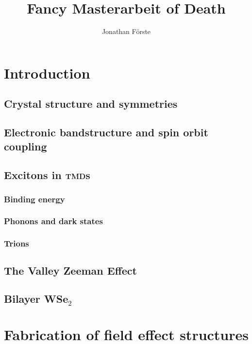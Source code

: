 \documentclass{scrbook}
\title{Fancy Masterarbeit of Death}
\author{Jonathan Förste}
\begin{document}
\maketitle
\tableofcontents
\chapter{Introduction}

	\section{Crystal structure and symmetries}
	\section{Electronic bandstructure and spin orbit coupling}
	\section{Excitons in \textsc{tmd}s}
		\subsection{Binding energy}
		\subsection{Phonons and dark states}
		\subsection{Trions}
	\section{The Valley Zeeman Effect}
	\section{Bilayer WSe$_2$}
\chapter{Fabrication of field effect structures}
	


\printbibliography
\end{document}
